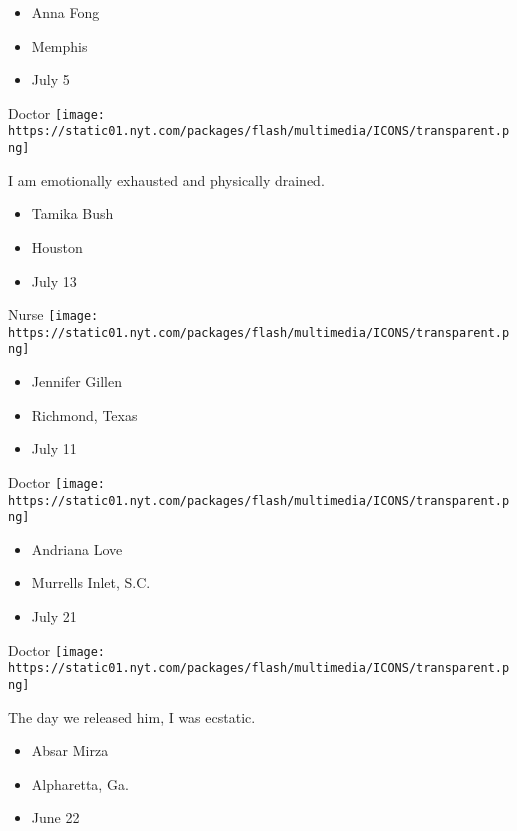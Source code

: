 \begin{itemize}
\tightlist
\item
  Anna Fong
\item
  Memphis
\item
  July 5
\end{itemize}

\protect\hyperlink{item-tamika-bush}{}

Doctor
\texttt{[image: https://static01.nyt.com/packages/flash/multimedia/ICONS/transparent.png]}

I am emotionally exhausted and physically drained.

\begin{itemize}
\tightlist
\item
  Tamika Bush
\item
  Houston
\item
  July 13
\end{itemize}

\protect\hyperlink{item-jennifer-gillen}{}

Nurse
\texttt{[image: https://static01.nyt.com/packages/flash/multimedia/ICONS/transparent.png]}

\begin{itemize}
\tightlist
\item
  Jennifer Gillen
\item
  Richmond, Texas
\item
  July 11
\end{itemize}

\protect\hyperlink{item-andriana-love}{}

Doctor
\texttt{[image: https://static01.nyt.com/packages/flash/multimedia/ICONS/transparent.png]}

\begin{itemize}
\tightlist
\item
  Andriana Love
\item
  Murrells Inlet, S.C.
\item
  July 21
\end{itemize}

\protect\hyperlink{item-absar-mirza}{}

Doctor
\texttt{[image: https://static01.nyt.com/packages/flash/multimedia/ICONS/transparent.png]}

The day we released him, I was ecstatic.

\begin{itemize}
\tightlist
\item
  Absar Mirza
\item
  Alpharetta, Ga.
\item
  June 22
\end{itemize}

